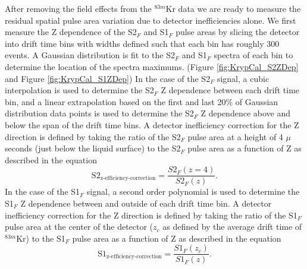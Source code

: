 \documentclass[a4paper,12pt]{article}
\begin{document}
{After removing the field effects from the $^{83m}$Kr data we are ready to measure the residual spatial pulse area variation due to detector inefficiencies alone.  We first measure the Z dependence of the S2$_F$ and S1$_F$ pulse areas by slicing the detector into drift time bins with widths defined such that each bin has roughly 300 events.  A Gaussian distribution is fit to the S2$_F$ and S1$_F$ spectra of each bin to determine the location of the spectra maximums. (Figure \ref{fig:KrypCal_S2ZDep} and Figure \ref{fig:KrypCal_S1ZDep}) In the case of the S2$_F$ signal, a cubic interpolation is used to determine the S2$_F$ Z dependence between each drift time bin, and a linear extrapolation based on the first and last 20\% of Gaussian distribution data points is used to determine the S2$_F$ Z dependence above and below the span of the drift time bins.  A detector inefficiency correction for the Z direction is defined by taking the ratio of the S2$_F$  pulse area at a height of 4 $\mu$seconds (just below the liquid surface) to the S2$_F$ pulse area as a function of Z as described in the equation
\begin{equation}
\mbox{S}2_{\mbox{z-efficiency-correction}} = \frac{S2_F(z=4)}{S2_F(z)}.
\end{equation} 
In the case of the S1$_F$ signal, a second order polynomial is used to determine the S1$_F$ Z dependence between and outside of each drift time bin. A detector inefficiency correction for the Z direction is defined by taking the ratio of the S1$_F$  pulse area at the center of the detector ($z_c$ as defined by the average drift time of $^{83m}$Kr) to the S1$_F$ pulse area as a function of Z as described in the equation
\begin{equation}
\mbox{S}1_{\mbox{z-efficiency-correction}} = \frac{S1_F(z_c)}{S1_F(z)}.
\end{equation} 

}
\end{document}
